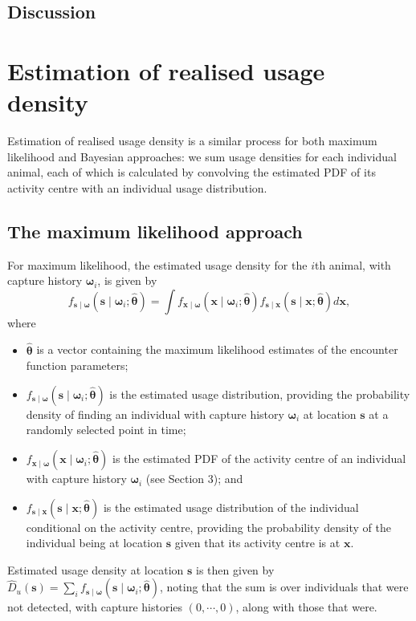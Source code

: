 \documentclass[10pt,a4paper]{article}\usepackage[]{graphicx}\usepackage[]{color}
\begin{document}
\subsection{Discussion}
\label{sec:appendix-discussion}

\section{Estimation of realised usage density}

Estimation of realised usage density is a similar process for both
maximum likelihood and Bayesian approaches: we sum usage densities for
each individual animal, each of which is calculated by convolving the
estimated PDF of its activity centre with an individual usage
distribution.

\subsection{The maximum likelihood approach}

For maximum likelihood, the estimated usage density for the $i$th
animal, with capture history $\bm{\omega}_i$, is given by
\begin{equation}
f_{\bm{s} \mid \bm{\omega}}(\bm{s} \mid \bm{\omega}_i; \bm{\widehat{\theta}}) =
\int f_{\bm{x} \mid \bm{\omega}}(\bm{x} \mid \bm{\omega}_i; \bm{\widehat{\theta}})
f_{\bm{s} \mid \bm{x}}(\bm{s} \mid \bm{x}; \bm{\widehat{\theta}}) d\bm{x}, \label{eq:ind-usage}
\end{equation}
where
\begin{itemize}
\item $\bm{\widehat{\theta}}$ is a vector containing the maximum
  likelihood estimates of the encounter function parameters;
\item $f_{\bm{s} \mid \bm{\omega}}(\bm{s} \mid
  \bm{\omega}_i; \bm{\widehat{\theta}})$ is the estimated usage distribution, providing the
  probability density of finding an individual with capture history
  $\bm{\omega}_i$ at location $\bm{s}$ at a randomly selected point in
  time;
\item $f_{\bm{x} \mid \bm{\omega}}(\bm{x} \mid \bm{\omega}_i;
  \bm{\widehat{\theta}})$ is the estimated PDF of the activity centre
  of an individual with capture history $\bm{\omega}_i$ (see Section
  3); and
\item $f_{\bm{s} \mid \bm{x}}(\bm{s} \mid \bm{x}; \bm{\widehat{\theta}})$ is the
  estimated usage distribution of the individual conditional on the
  activity centre, providing the probability density of the individual
  being at location $\bm{s}$ given that its activity centre is at
  $\bm{x}$.
\end{itemize}
Estimated usage density at location $\bm{s}$ is then given by
$\widehat{D}_u(\bm{s}) = \sum_i f_{\bm{s} \mid
  \bm{\omega}}(\bm{s} \mid \bm{\omega}_i; \bm{\widehat{\theta}})$, noting that the sum is
over individuals that were not detected, with capture histories $(0,
\cdots, 0)$, along with those that were.
\end{document}
